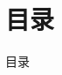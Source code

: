 \begin{frame}
	\titlepage
\end{frame}

\section*{目录}
\label{sec:toc}
\begin{frame}{目录}
	\textbf{\tableofcontents}
\end{frame}
